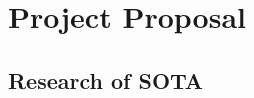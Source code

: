 


\newcommand{\TUGn}{Graz University of Technology}

\address[ICG]{Inst. for Computer Graphics and Vision \\ \TUGn, Austria}



















\begin{abstract}








\end{abstract}






\section{Project Proposal}

\subsection{Research of SOTA} %
\label{sub:research_of_sota}


